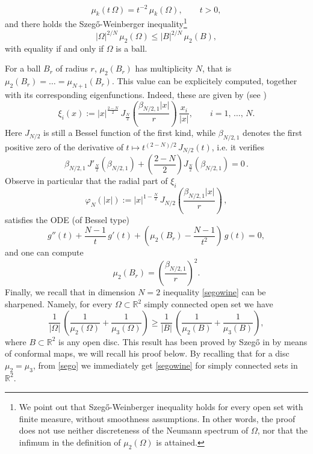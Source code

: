 \documentclass{amsart}
\theoremstyle{definition}
\numberwithin{equation}{section}
\begin{document}
\[
\mu_k(t\,\Omega)=t^{-2}\, \mu_k(\Omega),\qquad t>0,
\]
and there holds the Szeg\H{o}-Weinberger inequality\footnote{We point out that Szeg\H{o}-Weinberger inequality holds for every open set with finite measure, without smoothness assumptions. In other words, the proof does not use neither discreteness of the Neumann spectrum of $\Omega$, nor that the infimum in the definition of $\mu_2(\Omega)$ is attained.}
\begin{equation}
\label{segowine}
|\Omega|^{2/N}\,\mu_2(\Omega)\le |B|^{2/N}\,\mu_2(B),
\end{equation}
with equality if and only if $\Omega$ is a ball. 
\par
For a ball $B_r$ of radius $r$, $\mu_2(B_r)$ has multiplicity $N$, that is $\mu_2(B_r)=\dots=\mu_{N+1}(B_r)$. This value can be explicitely computed, together with its corresponding eigenfunctions. Indeed, these are given by (see \cite{MR2310200})
\begin{equation}
\label{autopalle}
\xi_i(x):=|x|^\frac{2-N}{2}\,J_\frac{N}{2}\left(\frac{\beta_{N/2,1}|x|}{r}\right)\,\frac{x_i}{|x|},\qquad i=1,\,\dots,\,N.
\end{equation}
Here $J_{N/2}$ is still a Bessel function of the first kind, 
while $\beta_{N/2,1}$ denotes the first positive zero of the derivative of $t\mapsto t^{(2-N)/2}\,J_{N/2}(t)$, i.e. it verifies
\[
\beta_{N/2,1}\,J'_\frac{N}{2}(\beta_{N/2,1})+\left(\frac{2-N}{2}\right) J_\frac{N}{2}(\beta_{N/2,1})=0\,.
\]
Observe in particular that the radial part of $\xi_i$ 
\begin{equation}
\label{Q}
\varphi_N(|x|):=|x|^{1-\frac{N}{2}}\,J_{N/2}\left(\frac{\beta_{N/2,1}|x|}{r}\right)\,,
\end{equation}
satisfies the ODE (of Bessel type)
\[
g''(t)+\frac{N-1}{t}\,g'(t)+\left(\mu_2(B_r)-\frac{N-1}{t^2}\right)\,g(t)=0,
\]
and one can compute
\[
\mu_2(B_r)=\left(\frac{\beta_{N/2,1}}{r}\right)^2.
\]
Finally, we recall that in dimension $N=2$ inequality \eqref{segowine} can be sharpened. Namely, for every $\Omega\subset\mathbb{R}^2$ simply connected open set we have
\begin{equation}
\label{sego}
\frac{1}{|\Omega|}\,\left(\frac{1}{\mu_2(\Omega)}+\frac{1}{\mu_3(\Omega)}\right)\ge \frac{1}{|B|}\,\left(\frac{1}{\mu_2(B)}+\frac{1}{\mu_3(B)}\right),
\end{equation}
where $B\subset\mathbb{R}^2$ is any open disc.
This result has been proved by Szeg\H{o} in \cite{MR0061749} by means of conformal maps, we will recall his proof below.
 By recalling that for a disc $\mu_2=\mu_3$, from \eqref{sego} we immediately get \eqref{segowine} for simply connected sets in $\mathbb{R}^2$.
\end{document}
